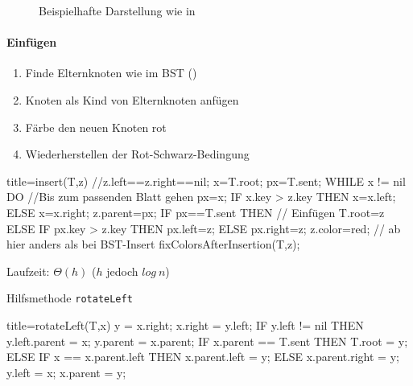 \documentclass[
    ngerman,
    color=3b,
    dark_mode,
    load_common, %
    summary,
    boxarc,
]{rubos-tuda-template}
\begin{document}
\begin{figure}[ht]
    \centering
    \caption{Beispielhafte Darstellung wie in }
    \label{fig:red_black_tree_example}
\end{figure}
\clearpage
\paragraph{Einfügen}
\begin{enumerate}
    \item Finde Elternknoten wie im BST ()
    \item Knoten als Kind von Elternknoten anfügen
    \item Färbe den neuen Knoten rot
    \item Wiederherstellen der Rot-Schwarz-Bedingung
\end{enumerate}
\begin{codeBlock}[autogobble,escapeinside=||]{title={insert(T,z) //z.left==z.right==nil;}}
    x=T.root; px=T.sent;
    WHILE x != nil DO                   //Bis zum passenden Blatt gehen
        px=x;
        IF x.key > z.key THEN
            x=x.left;
        ELSE
            x=x.right;
    z.parent=px;
    IF px==T.sent THEN                  // Einfügen
        T.root=z
    ELSE
        IF px.key > z.key THEN
            px.left=z;
        ELSE
            px.right=z;
    z.color=red;                        // ab hier anders als bei BST-Insert
    fixColorsAfterInsertion(T,z);
\end{codeBlock} 
Laufzeit: $\Theta(h)$ ($h$ jedoch $log~n$)

Hilfsmethode \texttt{rotateLeft}
\begin{codeBlock}[autogobble]{title={rotateLeft(T,x)}}
    y = x.right;
    x.right = y.left;
    IF y.left != nil THEN
        y.left.parent = x;
    y.parent = x.parent;
    IF x.parent == T.sent THEN
        T.root = y;
    ELSE
        IF x == x.parent.left THEN
            x.parent.left = y;
        ELSE
            x.parent.right = y;
    y.left = x;
    x.parent = y;
\end{codeBlock}
\clearpage
\end{document}
